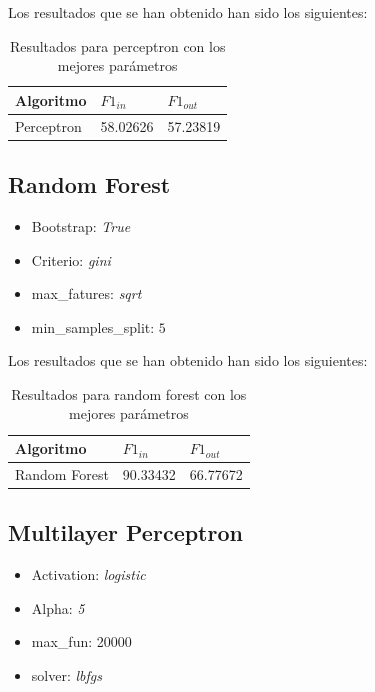 \documentclass[11pt]{article}
\begin{document}
Los resultados que se han obtenido han sido los siguientes:

\begin{table}[h!]
\centering
\begin{tabular}{|l|l|l|}
\hline
Algoritmo    & $F1_{in}$  & $F1_{out}$ \\ \hline
Perceptron & 58.02626 & 57.23819 \\ \hline
\end{tabular}
\caption{Resultados para perceptron con los mejores parámetros }
\end{table}

\subsection{Random Forest}

\begin{itemize}
    \item Bootstrap: \textit{True}
    \item Criterio: \textit{gini}
    \item max\_fatures: \textit{sqrt}
    \item min\_samples\_split: $5$
\end{itemize}

Los resultados que se han obtenido han sido los siguientes:

\begin{table}[h!]
\centering
\begin{tabular}{|l|l|l|}
\hline
Algoritmo    & $F1_{in}$  & $F1_{out}$ \\ \hline
Random Forest   & 90.33432 & 66.77672 \\ \hline
\end{tabular}
\caption{Resultados para random forest con los mejores parámetros}
\end{table}

\subsection{Multilayer Perceptron}

\begin{itemize}
    \item Activation: \textit{logistic}
    \item Alpha: \textit{5}
    \item max\_fun: 20000
    \item solver: \textit{lbfgs}
\end{itemize}
\end{document}
